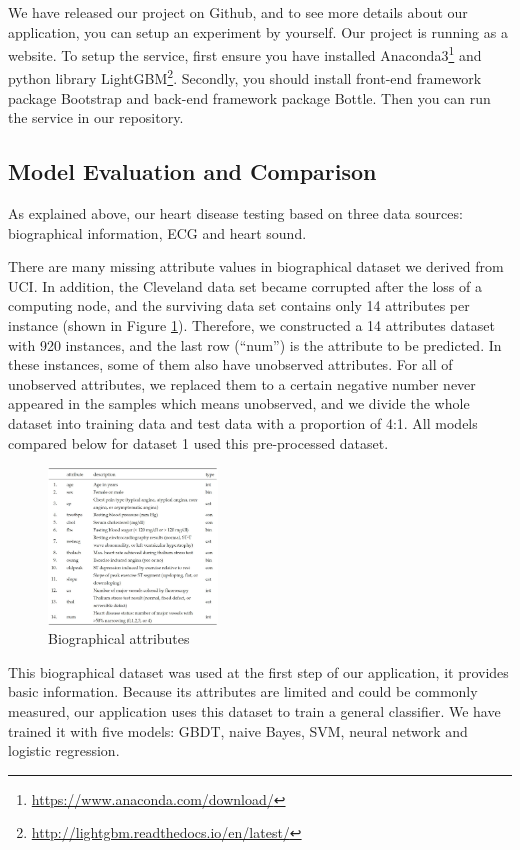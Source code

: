 \documentclass[letterpaper]{article} %
\begin{document}
We have released our project on Github, and to see more details about our application, you can setup an experiment by yourself. Our project is running as a website. To setup the service, first ensure you have installed Anaconda3\footnote{\url{https://www.anaconda.com/download/}} and python library LightGBM\footnote{\url{http://lightgbm.readthedocs.io/en/latest/}}. Secondly, you should install front-end framework package Bootstrap and back-end framework package Bottle. Then you can run the service in our repository.

\subsection{Model Evaluation and Comparison}

As explained above, our heart disease testing based on three data sources: biographical information, ECG and heart sound.

There are many missing attribute values in biographical dataset we derived from UCI. In addition, the Cleveland data set became corrupted after the loss of a computing node, and the surviving data set contains only 14 attributes per instance (shown in Figure \ref{fig:dataset-1}). Therefore, we constructed a 14 attributes dataset with 920 instances, and the last row (``num'') is the attribute to be predicted. In these instances, some of them also have unobserved attributes. For all of unobserved attributes, we replaced them to a certain negative number never appeared in the samples which means unobserved, and we divide the whole dataset into training data and test data with a proportion of 4:1. All models compared below for dataset 1 used this pre-processed dataset.

\begin{figure}[!htbp]
\centering\includegraphics[width=0.4\textwidth]{dataset-1}
\caption{Biographical attributes}
\label{fig:dataset-1}
\end{figure}

This biographical dataset was used at the first step of our application, it provides basic information. Because its attributes are limited and could be commonly measured, our application uses this dataset to train a general classifier. We have trained it with five models: GBDT, naive Bayes, SVM, neural network and logistic regression. 
\end{document}
